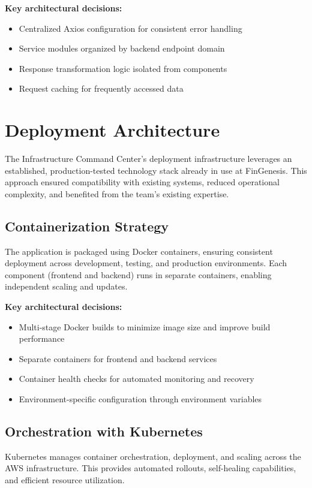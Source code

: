 \textbf{Key architectural decisions:}
\begin{itemize}
    \item Centralized Axios configuration for consistent error handling
    \item Service modules organized by backend endpoint domain
    \item Response transformation logic isolated from components
    \item Request caching for frequently accessed data
\end{itemize}

\section{Deployment Architecture}

The Infrastructure Command Center's deployment infrastructure leverages an established, production-tested technology stack already in use at FinGenesis. This approach ensured compatibility with existing systems, reduced operational complexity, and benefited from the team's existing expertise.

\subsection{Containerization Strategy}

The application is packaged using Docker containers, ensuring consistent deployment across development, testing, and production environments. Each component (frontend and backend) runs in separate containers, enabling independent scaling and updates.

\textbf{Key architectural decisions:}
\begin{itemize}
    \item Multi-stage Docker builds to minimize image size and improve build performance
    \item Separate containers for frontend and backend services
    \item Container health checks for automated monitoring and recovery
    \item Environment-specific configuration through environment variables
\end{itemize}

\subsection{Orchestration with Kubernetes}

Kubernetes manages container orchestration, deployment, and scaling across the AWS infrastructure. This provides automated rollouts, self-healing capabilities, and efficient resource utilization.

